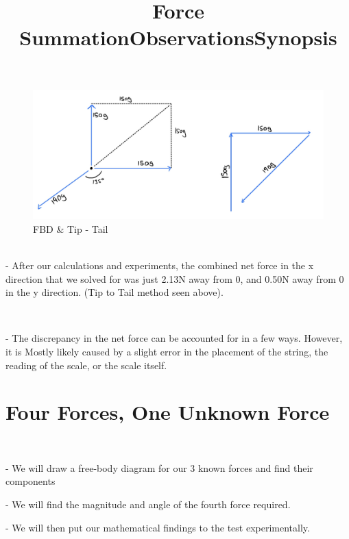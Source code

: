 \documentclass[letter paper, title page]{article}
\begin{document}
\begin{figure}[H]
    \centering
    \includegraphics[scale = 0.2]{freebody-tiptotail.jpg}
    \caption{FBD \& Tip - Tail}
    \label{fig:my_label}
\end{figure}

\noindent
\title{\textbf{Force Summation}}

\begin{list}
    \list \\ - After our calculations and experiments, the combined net force in the x direction that we solved for was just 2.13N away from 0, and 0.50N away from 0 in the y direction. (Tip to Tail method seen above). 
\end{list}

\noindent
\title{\textbf{Observations}}

\begin{list}
    \\\item - The discrepancy in the net force can be accounted for in a few ways. However, it is Mostly likely caused by a slight error in the placement of the string, the reading of the scale, or the scale itself. 
\end{list}

\newpage

\section*{Four Forces, One Unknown Force}

\noindent
\title{\textbf{Synopsis}}

\begin{list}
    \\\item - We will draw a free-body diagram for our 3 known forces and find their components

            - We will find the magnitude and angle of the fourth force required.

            - We will then put our mathematical findings to the test experimentally. \\ 
\end{list}
\end{document}
